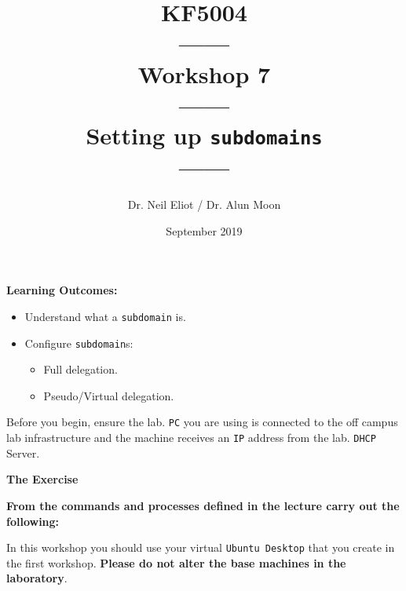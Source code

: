 \documentclass[11pt]{article}
\begin{document}
\author{Dr. Neil Eliot / Dr. Alun Moon}
\title{KF5004\\------\\Workshop 7\\------\\Setting up \texttt{subdomains}\\------}
\date{September 2019}
\maketitle

\newpage



\noindent\textbf{Learning Outcomes:}
\begin{itemize}
    \item Understand what a \texttt{subdomain} is.
    \item Configure \texttt{subdomain}s:
        \begin{itemize}
            \item Full delegation.
            \item Pseudo/Virtual delegation.
        \end{itemize}
\end{itemize}


\begin{tcolorbox}[title={\textbf{Important:}}]
    Before you begin, ensure the lab. \texttt{PC} you are using is connected to the off campus lab infrastructure and the machine receives an \texttt{IP} address from the lab. \texttt{DHCP} Server.
\end{tcolorbox}
\newpage

\noindent\textbf{The Exercise}\\
\begin{tcolorbox}[colback=blue!20]
    \noindent\textbf{From the commands and processes defined in the lecture carry out the following:}
\end{tcolorbox}


\begin{tcolorbox}[title={\textbf{NOTE:}}]
    In this workshop you should use your virtual \texttt{Ubuntu Desktop} that you create in the first workshop. \textbf{Please do not alter the base machines in the laboratory}.
\end{tcolorbox}
\end{document}
